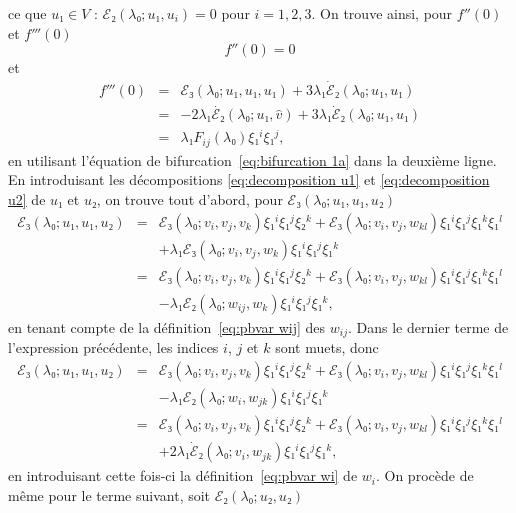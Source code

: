 \documentclass[12pt, final]{amsart}
\theoremstyle{definition}
\begin{document}
ce que $u₁∈V$ : $ℰ₂ (λ₀ ; u₁, u_i) = 0$ pour $i = 1,
2, 3$. On trouve ainsi, pour $f'' (0)$ et $f''' (0)$
\begin{equation}
  \label{eq:DL energie derivee 2nde} f'' (0) = 0
\end{equation}
et
\begin{eqnarray}
  f''' (0) & = & ℰ₃ (λ₀ ; u₁, u₁, u₁) + 3 λ₁
  \dot{ℰ}₂ (λ₀ ; u₁, u₁) \nonumber\\
  & = & - 2 λ₁  \dot{ℰ₂} (λ₀ ; u₁, \hat{v}) + 3
  λ₁  \dot{ℰ}₂ (λ₀ ; u₁, u₁) \nonumber\\
  & = & λ₁ F_{i  j} (λ₀) ξ₁^i ξ₁^j,  \label{eq:DL
  energie derivee 3ieme}
\end{eqnarray}
en utilisant l'équation de bifurcation~\eqref{eq:bifurcation 1a} dans la
deuxième ligne. En introduisant les décompositions
\eqref{eq:decomposition u1} et \eqref{eq:decomposition u2} de $u₁$ et $u₂$,
on trouve tout d'abord, pour $ℰ₃ (λ₀ ; u₁, u₁, u₂)$
\begin{eqnarray*}
  ℰ₃ (λ₀ ; u₁, u₁, u₂) & = & ℰ₃ (λ₀ ;
  v_i, v_j, v_k) ξ₁^i ξ₁^j ξ₂^k +ℰ₃ (λ₀ ; v_i, v_j,
  w_{k  l}) ξ₁^i ξ₁^j ξ₁^k ξ₁^l\\
  &  &  + λ₁ ℰ₃ (λ₀ ; v_i, v_j, w_k)
  ξ₁^i ξ₁^j ξ₁^k\\
  & = & ℰ₃ (λ₀ ; v_i, v_j, v_k) ξ₁^i ξ₁^j ξ₂^k
  +ℰ₃ (λ₀ ; v_i, v_j, w_{k  l}) ξ₁^i ξ₁^j
  ξ₁^k ξ₁^l\\
  &  &  - λ₁ ℰ₂ (λ₀ ; w_{i  j},
  w_k) ξ₁^i ξ₁^j ξ₁^k,
\end{eqnarray*}
en tenant compte de la définition~\eqref{eq:pbvar wij} des $w_{i
j}$. Dans le dernier terme de l'expression précédente, les indices
$i$, $j$ et $k$ sont muets, donc
\begin{eqnarray*}
  ℰ₃ (λ₀ ; u₁, u₁, u₂) & = & ℰ₃ (λ₀ ;
  v_i, v_j, v_k) ξ₁^i ξ₁^j ξ₂^k +ℰ₃ (λ₀ ; v_i, v_j,
  w_{k  l}) ξ₁^i ξ₁^j ξ₁^k ξ₁^l\\
  &  &  - λ₁ ℰ₂ (λ₀ ; w_{i }, w_{j
   k}) ξ₁^i ξ₁^j ξ₁^k\\
  & = & ℰ₃ (λ₀ ; v_i, v_j, v_k) ξ₁^i ξ₁^j ξ₂^k
  +ℰ₃ (λ₀ ; v_i, v_j, w_{k  l}) ξ₁^i ξ₁^j
  ξ₁^k ξ₁^l\\
  &  &  + 2 λ₁  \dot{ℰ}₂ (λ₀ ; v_{i
  }, w_{j  k}) ξ₁^i ξ₁^j ξ₁^k,
\end{eqnarray*}
en introduisant cette fois-ci la définition~\eqref{eq:pbvar wi} de $w_i .$
On procède de même pour le terme suivant, soit $ℰ₂
(λ₀ ; u₂, u₂)$
\end{document}
